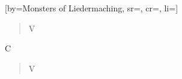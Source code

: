 [by={Monsters of Liedermaching}, sr={}, cr={}, li={}]

\begin{verse}
V
\end{verse}

\begin{chorus}
C
\end{chorus}

\chordsoff

\begin{verse}
V
\end{verse}

\endsong